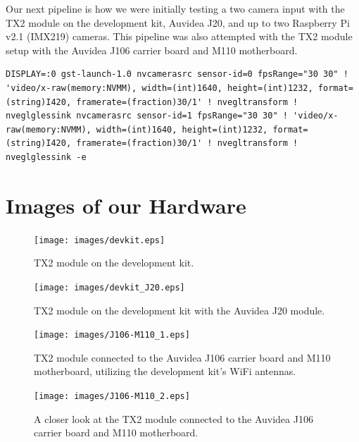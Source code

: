 \documentclass[letterpaper,10pt,serif,draftclsnofoot,onecolumn,compsoc,titlepage]{IEEEtran}
\begin{document}
Our next pipeline is how we were initially testing a two camera input with the TX2 module 
on the development kit, Auvidea J20, and up to two Raspberry Pi v2.1 (IMX219) cameras. 
This pipeline was also attempted with the TX2 module setup with the Auvidea J106 carrier
board and M110 motherboard. \\

\begin{lstlisting}
DISPLAY=:0 gst-launch-1.0 nvcamerasrc sensor-id=0 fpsRange="30 30" ! 'video/x-raw(memory:NVMM), width=(int)1640, height=(int)1232, format=(string)I420, framerate=(fraction)30/1' ! nvegltransform ! nveglglessink nvcamerasrc sensor-id=1 fpsRange="30 30" ! 'video/x-raw(memory:NVMM), width=(int)1640, height=(int)1232, format=(string)I420, framerate=(fraction)30/1' ! nvegltransform ! nveglglessink -e
\end{lstlisting}
\cite{TwoCamPipe}


\section{Images of our Hardware}

\begin{figure}[H]
	\centering
	\label{fig:TX2 module on the development kit.}
	\texttt{[image: images/devkit.eps]}
	\caption{TX2 module on the development kit. \label{overflow}}
\end{figure}


\begin{figure}[H]
	\centering
	\label{fig:TX2 module on the development kit with the Auvidea J20 module.}
	\texttt{[image: images/devkit\_J20.eps]}
	\caption{TX2 module on the development kit with the Auvidea J20 module. \label{overflow}}
\end{figure}


\begin{figure}[H]
	\centering
	\label{fig:TX2 module connected to the Auvidea J106 carrier board and M110 motherboard, utilizing the development kit's WiFi antennas.}
	\texttt{[image: images/J106-M110\_1.eps]}
	\caption{TX2 module connected to the Auvidea J106 carrier board and M110 motherboard, utilizing the development kit's WiFi antennas. \label{overflow}}
\end{figure}


\begin{figure}[H]
	\centering
	\label{fig:A closer look at the TX2 module connected to the Auvidea J106 carrier board and M110 motherboard.}
	\texttt{[image: images/J106-M110\_2.eps]}
	\caption{A closer look at the TX2 module connected to the Auvidea J106 carrier board and M110 motherboard. \label{overflow}}
\end{figure}
\end{document}
